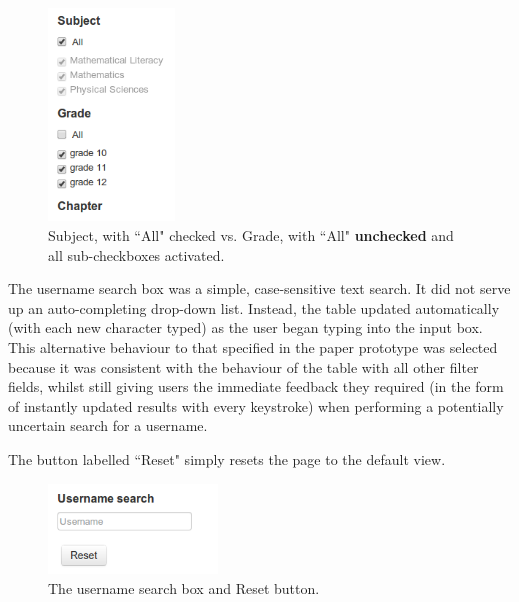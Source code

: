 \begin{figure}[h!]
    \centering
    \includegraphics[width=0.3\textwidth]{Figures/V1/alldeselected1.PNG}
 \caption{Subject, with ``All" checked vs. Grade, with ``All" \textbf{unchecked} and all sub-checkboxes activated.}
\end{figure}

The username search box was a simple, case-sensitive text search. It did not serve up an auto-completing drop-down list. Instead, the table updated automatically (with each new character typed) as the user began typing into the input box. This alternative behaviour to that specified in the paper prototype was selected because it was consistent \citep[p. 261]{DixFinlay} with the behaviour of the table with all other filter fields, whilst still giving users the immediate feedback they required (in the form of instantly updated results  with every keystroke) when performing a potentially uncertain search for a username. 

The button labelled ``Reset" simply resets the page to the default view. 
\begin{figure}[h!]
    \centering
    \includegraphics[width=0.4\textwidth]{Figures/V1/usernameReset.png}
 \caption{The username search box and Reset button.}

\end{figure}

